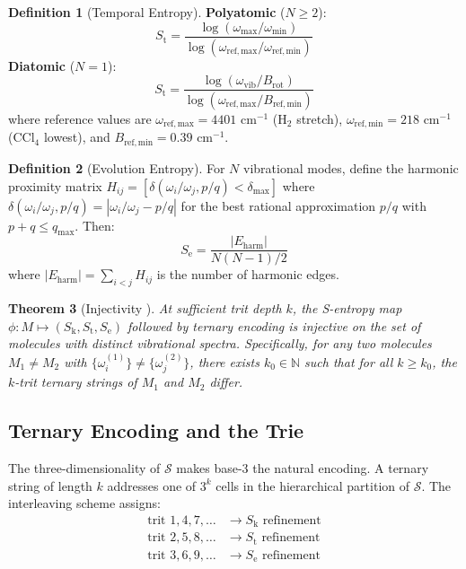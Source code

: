 \documentclass[11pt,twocolumn,a4paper]{article}
\newtheorem{theorem}{Theorem}[section]
\theoremstyle{definition}
\newtheorem{definition}[theorem]{Definition}
\theoremstyle{remark}
\newcommand{\Sk}{S_{\mathrm{k}}}
\newcommand{\St}{S_{\mathrm{t}}}
\newcommand{\Se}{S_{\mathrm{e}}}
\newcommand{\Sspace}{\mathcal{S}}
\newcommand{\Natural}{\mathbb{N}}
\newcommand{\Brot}{B_{\mathrm{rot}}}
\begin{document}
\begin{definition}[Temporal Entropy]
\label{def:st}
\textbf{Polyatomic} ($N \geq 2$):
\begin{equation}
\St = \frac{\log(\omega_{\max}/\omega_{\min})}{\log(\omega_{\mathrm{ref,max}}/\omega_{\mathrm{ref,min}})}
\label{eq:st_poly}
\end{equation}
\textbf{Diatomic} ($N = 1$):
\begin{equation}
\St = \frac{\log(\omega_{\mathrm{vib}}/\Brot)}{\log(\omega_{\mathrm{ref,max}}/B_{\mathrm{ref,min}})}
\label{eq:st_diatomic}
\end{equation}
where reference values are $\omega_{\mathrm{ref,max}} = 4401$ cm$^{-1}$ (H$_2$ stretch), $\omega_{\mathrm{ref,min}} = 218$ cm$^{-1}$ (CCl$_4$ lowest), and $B_{\mathrm{ref,min}} = 0.39$ cm$^{-1}$.
\end{definition}

\begin{definition}[Evolution Entropy]
\label{def:se}
For $N$ vibrational modes, define the harmonic proximity matrix $H_{ij} = [\delta(\omega_i/\omega_j, p/q) < \delta_{\max}]$ where $\delta(\omega_i/\omega_j, p/q) = |\omega_i/\omega_j - p/q|$ for the best rational approximation $p/q$ with $p + q \leq q_{\max}$. Then:
\begin{equation}
\Se = \frac{|E_{\mathrm{harm}}|}{N(N-1)/2}
\label{eq:se}
\end{equation}
where $|E_{\mathrm{harm}}| = \sum_{i<j} H_{ij}$ is the number of harmonic edges.
\end{definition}

\begin{theorem}[Injectivity {\citep[Theorem~5.1]{sachikonye2025c}}]
\label{thm:injectivity}
At sufficient trit depth $k$, the S-entropy map $\phi: M \mapsto (\Sk, \St, \Se)$ followed by ternary encoding is injective on the set of molecules with distinct vibrational spectra. Specifically, for any two molecules $M_1 \neq M_2$ with $\{\omega_i^{(1)}\} \neq \{\omega_j^{(2)}\}$, there exists $k_0 \in \Natural$ such that for all $k \geq k_0$, the $k$-trit ternary strings of $M_1$ and $M_2$ differ.
\end{theorem}

\subsection{Ternary Encoding and the Trie}

The three-dimensionality of $\Sspace$ makes base-3 the natural encoding. A ternary string of length $k$ addresses one of $3^k$ cells in the hierarchical partition of $\Sspace$. The interleaving scheme assigns:
\begin{align}
\text{trit } 1, 4, 7, \ldots &\to \Sk \text{ refinement} \\
\text{trit } 2, 5, 8, \ldots &\to \St \text{ refinement} \\
\text{trit } 3, 6, 9, \ldots &\to \Se \text{ refinement}
\end{align}
\end{document}
